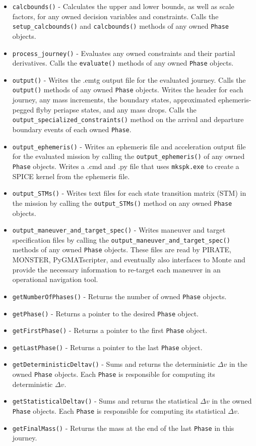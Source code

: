 \begin{itemize}
	\item \texttt{calcbounds()} - Calculates the upper and lower bounds, as well as scale factors, for any owned decision variables and constraints. Calls the \texttt{setup\_calcbounds()} and \texttt{calcbounds()} methods of any owned \texttt{Phase} objects.
	\item \texttt{process\_journey()} - Evaluates any owned constraints and their partial derivatives. Calls the \texttt{evaluate()} methods of any owned \texttt{Phase} objects.
	\item \texttt{output()} - Writes the .emtg output file for the evaluated journey. Calls the \texttt{output()} methods of any owned \texttt{Phase} objects. Writes the header for each journey, any mass increments, the boundary states, approximated ephemeris-pegged flyby periapse states, and any mass drops. Calls the \texttt{output\_specialized\_constraints()} method on the arrival and departure boundary events of each owned \texttt{Phase}.
	\item \texttt{output\_ephemeris()} - Writes an ephemeris file and acceleration output file for the evaluated mission by calling the \texttt{output\_ephemeris()} of any owned \texttt{Phase} objects. Writes a .cmd and .py file that uses \texttt{mkspk.exe} to create a SPICE kernel from the ephemeris file.
	\item \texttt{output\_STMs()} - Writes text files for each state transition matrix (STM) in the mission by calling the \texttt{output\_STMs()} method on any owned \texttt{Phase} objects.
	\item \texttt{output\_maneuver\_and\_target\_spec()} - Writes maneuver and target specification files by calling the \texttt{output\_maneuver\_and\_target\_spec()} methods of any owned \texttt{Phase} objects. These files are read by PIRATE, MONSTER, PyGMATscripter, and eventually also interfaces to Monte and provide the necessary information to re-target each maneuver in an operational navigation tool.
	\item \texttt{getNumberOfPhases()} - Returns the number of owned \texttt{Phase} objects.
	\item \texttt{getPhase()} - Returns a pointer to the desired \texttt{Phase} object.
	\item \texttt{getFirstPhase()} - Returns a pointer to the first \texttt{Phase} object.
	\item \texttt{getLastPhase()} - Returns a pointer to the last \texttt{Phase} object.
	\item \texttt{getDeterministicDeltav()} - Sums and returns the deterministic $\Delta v$ in the owned \texttt{Phase} objects. Each \texttt{Phase} is responsible for computing its deterministic $\Delta v$.
	\item \texttt{getStatisticalDeltav()} - Sums and returns the statistical $\Delta v$ in the owned \texttt{Phase} objects. Each \texttt{Phase} is responsible for computing its statistical $\Delta v$.
	\item \texttt{getFinalMass()} - Returns the mass at the end of the last \texttt{Phase} in this journey.
\end{itemize}


